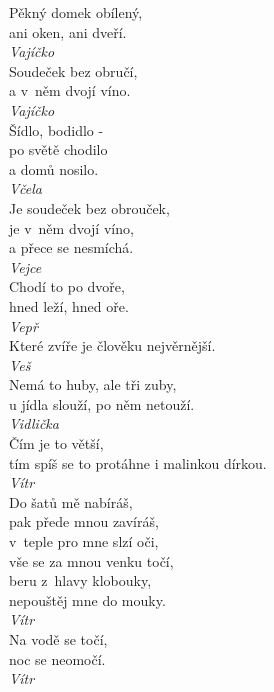 \begin{multicols}{4}
\noindent
Pěkný domek obílený,\\
ani oken, ani dveří.\\[1 mm]
{\sl Vajíčko}\\

\noindent
Soudeček bez obručí,\\
a v~něm dvojí víno.\\[1 mm]
{\sl Vajíčko}\\

\noindent
Šídlo, bodidlo -\\
po světě chodilo\\
a domů nosilo.\\[1 mm]
{\sl Včela}\\

\noindent
Je soudeček bez obrouček,\\
je v~něm dvojí víno,\\
a přece se nesmíchá.\\[1 mm]
{\sl Vejce}\\

\noindent
Chodí to po dvoře,\\
hned leží, hned oře.\\[1 mm]
{\sl Vepř}\\

\noindent
Které zvíře je člověku nejvěrnější.\\[1 mm]
{\sl Veš}\\

\noindent
Nemá to huby, ale tři zuby,\\
u jídla slouží, po něm netouží.\\[1 mm]
{\sl Vidlička}\\

\noindent
Čím je to větší,\\
tím spíš se to protáhne i malinkou dírkou.\\[1 mm]
{\sl Vítr}\\

\noindent
Do šatů mě nabíráš,\\
pak přede mnou zavíráš,\\
v~teple pro mne slzí oči,\\
vše se za mnou venku točí,\\
beru z~hlavy klobouky,\\
nepouštěj mne do mouky.\\[1 mm]
{\sl Vítr}\\

\noindent
Na vodě se točí,\\
noc se neomočí.\\[1 mm]
{\sl Vítr}\\


\end{multicols}
